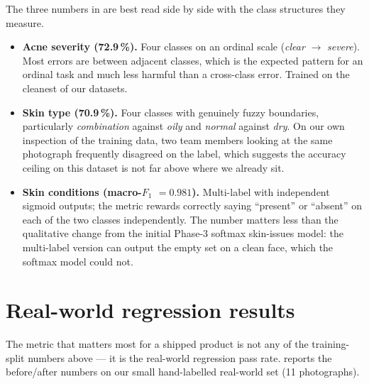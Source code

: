 \documentclass[11pt,a4paper,oneside]{report}
\begin{document}
The three numbers in  are best read side by
side with the class structures they measure.

\begin{itemize}
    \item \textbf{Acne severity (72.9\,\%).} Four classes on an
        ordinal scale (\emph{clear} \(\to\) \emph{severe}). Most
        errors are between adjacent classes, which is the expected
        pattern for an ordinal task and much less harmful than a
        cross-class error. Trained on the cleanest of our datasets.
    \item \textbf{Skin type (70.9\,\%).} Four classes with genuinely
        fuzzy boundaries, particularly \emph{combination} against
        \emph{oily} and \emph{normal} against \emph{dry}. On our
        own inspection of the training data, two team members
        looking at the same photograph frequently disagreed on the
        label, which suggests the accuracy ceiling on this dataset
        is not far above where we already sit.
    \item \textbf{Skin conditions (macro-\(F_1\) \(= 0.981\)).}
        Multi-label with independent sigmoid outputs; the metric
        rewards correctly saying ``present'' or ``absent'' on each
        of the two classes independently. The number matters less
        than the qualitative change from the initial Phase-3
        softmax skin-issues model: the multi-label version can
        output the empty set on a clean face, which the softmax
        model could not.
\end{itemize}

\section{Real-world regression results}

The metric that matters most for a shipped product is not any of
the training-split numbers above --- it is the real-world
regression pass rate.  reports the
before/after numbers on our small hand-labelled real-world set
(11 photographs).
\end{document}
